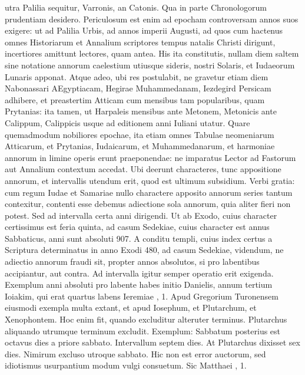 utra Palilia sequitur, Varronis, an Catonis.
Qua in parte Chronologorum
prudentiam desidero.
Periculosum est enim ad epocham
controversam annos suos exigere: ut ad Palilia Urbis, ad annos imperii
Augusti, ad quos cum hactenus omnes Historiarum et Annalium
scriptores tempus natalis Christi dirigunt, incertiores amittunt
lectores, quam antea.
His ita constitutis, nullam diem saltem sine
notatione annorum caelestium utiusque sideris, nostri Solaris, et Iudaeorum
Lunaris apponat.
Atque adeo, ubi res postulabit, ne gravetur
etiam diem Nabonassari AEgyptiacam, Hegirae Muhammedanam,
Iezdegird Persicam adhibere, et preastertim Atticam cum mensibus
tam popularibus, quam Prytanias: ita tamen, ut Harpaleis mensibus
ante Metonem, Metonicis ante Calippum, Calippicis usque ad
editionem anni Iuliani utatur.
Quare quemadmodum nobiliores epochae,
ita etiam omnes Tabulae neomeniarum Atticarum, et Prytanias,
Iudaicarum, et Muhammedanarum, et harmoniae annorum
in limine operis erunt praeponendae: ne imparatus Lector ad Fastorum
aut Annalium contextum accedat.
%
Ubi deerunt characteres,
tunc appositione annorum, et intervallis utendum erit, quod est ultimum
subsidium.
Verbi gratia: cum regum Iudae et Samariae nullo
charactere apposito annorum series tantum contexitur, contenti esse
debemus adiectione sola annorum, quia aliter fieri non potest.
Sed
ad intervalla certa anni dirigendi.
Ut ab Exodo, cuius character certissimus
est feria quinta, ad casum Sedekiae, cuius character est annus
Sabbaticus, anni sunt absoluti 907.
A conditu templi, cuius index certus
a Scriptura determinatus in anno Exodi 480, ad casum Sedekiae,
videndum, ne adiectio annorum fraudi sit, propter annos absolutos,
si pro labentibus accipiantur, aut contra.
Ad intervalla igitur
semper operatio erit exigenda.
Exemplum anni absoluti pro labente
habes initio Danielis, annum tertium Ioiakim, qui erat quartus labens
Ieremiae , 1.
Apud Gregorium Turonensem eiusmodi
exempla multa extant, et apud Iosephum, et Plutarchum, et
Xenophontem.
Hoc enim fit, quando excluditur alteruter terminus.
Plutarchus aliquando utrumque terminum excludit.
Exemplum: Sabbatum
posterius est octavus dies a priore sabbato.
Intervallum septem
dies.
At Plutarchus dixisset sex dies.
Nimirum excluso utroque
sabbato.
Hic non est error auctorum, sed idiotismus usurpantium
modum vulgi consuetum.
Sic Matthaei , 1.
